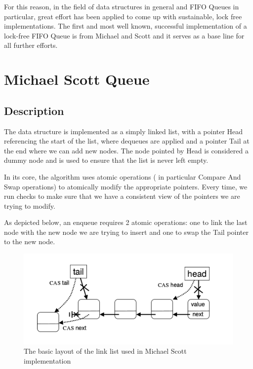 
For this reason, in the field of data structures in general and FIFO Queues in particular, great effort has been applied to come up with sustainable, lock free implementations. The first and most well known, successful implementation of a lock-free FIFO Queue is from Michael and Scott \cite{msqueue} and it serves as a base line for all further efforts.

\section{Michael Scott Queue}
\subsection{Description}

The data structure is implemented as a simply linked list, with a pointer Head referencing the start of the list, where dequeues are applied and a pointer Tail at the end where we can add new nodes. The node pointed by Head is considered a dummy node  and is used to ensure that the list is never left empty.

In its core, the algorithm uses atomic operations ( in particular Compare And Swap operations) to atomically modify the appropriate pointers. Every time, we run checks to make sure that we have a consistent view of the pointers we are trying to modify.

As depicted below, an enqueue requires 2 atomic operations: one to link the last node with the new node we are trying to insert and one to swap the Tail pointer to the new node.

\begin{figure}
 \centering
  \includegraphics[scale=0.4]{msqueue_struct.png}
\caption{ The basic layout of the link list used in Michael Scott implementation}
\end{figure}

